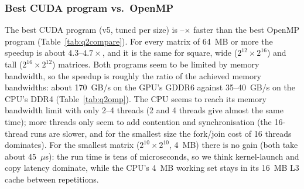 \subsubsection*{Best CUDA program vs.\ OpenMP}

The best CUDA program (v5, tuned per size) is \qtwospeedupmin--\qtwospeedupmax$\times$
faster than the best OpenMP program (Table~\ref{tab:q2compare}). For every matrix of
64~MB or more the speedup is about $4.3$--$4.7\times$, and it is the same for
square, wide ($2^{12}\times2^{16}$) and tall ($2^{16}\times2^{12}$)
matrices. Both programs seem to be limited by memory bandwidth, so the speedup is roughly
the ratio of the achieved memory bandwidths: about 170~GB/s on the GPU's GDDR6 against 35--40~GB/s
on the CPU's DDR4 (Table~\ref{tab:q2omp}). The CPU seems to reach its memory
bandwidth limit with only 2--4 threads (2 and 4 threads give almost the same time); more threads only seem to add contention and
synchronisation (the 16-thread runs are slower, and for the smallest size the
fork/join cost of 16 threads dominates). For the smallest matrix
($2^{10}\times2^{10}$, 4~MB) there is no gain (both take about 45~$\mu$s): the run time is
tens of microseconds, so we think kernel-launch and copy latency dominate, while the
CPU's 4~MB working set stays in its 16~MB L3 cache between repetitions.
